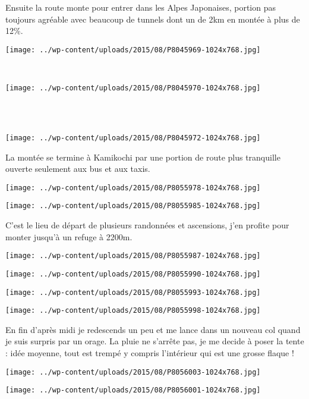   Ensuite la route monte pour entrer dans les Alpes Japonaises, portion pas toujours agréable avec beaucoup de tunnels dont un de 2km en montée à plus de 12\%. 
\begin{center} \texttt{[image: ../wp-content/uploads/2015/08/P8045969-1024x768.jpg]} \end{center}
~\\
\begin{center} \texttt{[image: ../wp-content/uploads/2015/08/P8045970-1024x768.jpg]} \end{center}
\vspace{-\topsep}
\pagebreak
~\\~\\
\vspace{1mm}
\begin{center} \texttt{[image: ../wp-content/uploads/2015/08/P8045972-1024x768.jpg]} \end{center}

 La montée se termine à Kamikochi par une portion de route plus tranquille ouverte seulement aux bus et aux taxis. 
\begin{center} \texttt{[image: ../wp-content/uploads/2015/08/P8055978-1024x768.jpg]} \end{center}
\begin{center} \texttt{[image: ../wp-content/uploads/2015/08/P8055985-1024x768.jpg]} \end{center}

 C'est le lieu de départ de plusieurs randonnées et ascensions, j'en profite pour monter jusqu'à un refuge à 2200m. 
\begin{center} \texttt{[image: ../wp-content/uploads/2015/08/P8055987-1024x768.jpg]} \end{center}
\begin{center} \texttt{[image: ../wp-content/uploads/2015/08/P8055990-1024x768.jpg]} \end{center}
\begin{center} \texttt{[image: ../wp-content/uploads/2015/08/P8055993-1024x768.jpg]} \end{center}
\begin{center} \texttt{[image: ../wp-content/uploads/2015/08/P8055998-1024x768.jpg]} \end{center}

 En fin d'après midi je redescends un peu et me lance dans un nouveau col quand je suis surpris par un orage. La pluie ne s'arrête pas, je me decide à poser la tente : idée moyenne, tout est trempé y compris l'intérieur qui est une grosse flaque ! 
\begin{center} \texttt{[image: ../wp-content/uploads/2015/08/P8056003-1024x768.jpg]} \end{center}
\begin{center} \texttt{[image: ../wp-content/uploads/2015/08/P8056001-1024x768.jpg]} \end{center}

